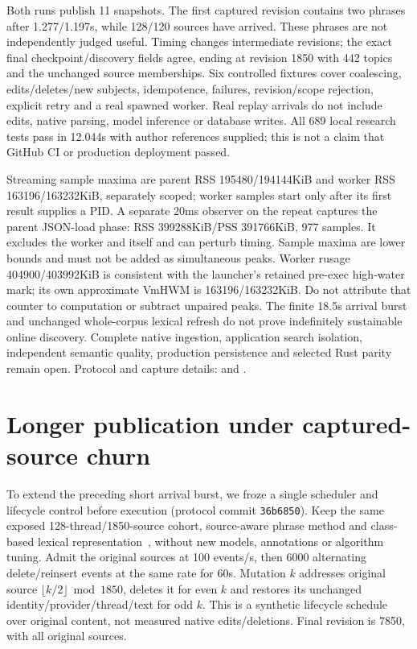 \documentclass[11pt]{article}
\begin{document}
Both runs publish 11 snapshots. The first captured revision contains two phrases
after 1.277/1.197s, while 128/120 sources have arrived. These phrases are not
independently judged useful. Timing changes intermediate revisions; the exact
final checkpoint/discovery fields agree, ending at revision 1850 with 442 topics
and the unchanged source memberships. Six controlled fixtures cover coalescing,
edits/deletes/new subjects, idempotence, failures, revision/scope rejection,
explicit retry and a real spawned worker. Real replay arrivals do not include
edits, native parsing, model inference or database writes.
All 689 local research tests pass in 12.044s with author references supplied;
this is not a claim that GitHub CI or production deployment passed.

Streaming sample maxima are parent RSS 195480/194144KiB and worker
RSS 163196/163232KiB, separately scoped; worker samples start only after its first
result supplies a PID. A separate 20ms observer on the repeat captures the parent
JSON-load phase: RSS 399288KiB/PSS 391766KiB, 977 samples. It excludes the worker
and itself and can perturb timing. Sample maxima are lower bounds and must not
be added as simultaneous peaks. Worker rusage 404900/403992KiB is consistent
with the launcher's retained pre-exec high-water mark; its own approximate VmHWM
is 163196/163232KiB. Do not attribute that counter to computation or subtract
unpaired peaks. The finite 18.5s arrival burst and unchanged whole-corpus lexical
refresh do not prove indefinitely sustainable online discovery. Complete native
ingestion, application search isolation, independent semantic quality, production
persistence and selected Rust parity remain open.
Protocol and capture details: 
and .

\section{Longer publication under captured-source churn}
To extend the preceding short arrival burst, we froze a single scheduler and
lifecycle control before execution (protocol commit \texttt{36b6850}). Keep the
same exposed 128-thread/1850-source cohort, source-aware phrase method and
class-based lexical representation~\cite{bertopic}, without new models,
annotations or algorithm tuning. Admit the original sources at 100 events/s,
then 6000 alternating delete/reinsert events at the same rate for 60s. Mutation
$k$ addresses original source $\lfloor k/2\rfloor\bmod1850$, deletes it for
even $k$ and restores its unchanged identity/provider/thread/text for odd $k$.
This is a synthetic lifecycle schedule over original content, not measured
native edits/deletions. Final revision is 7850, with all original sources.
\end{document}
